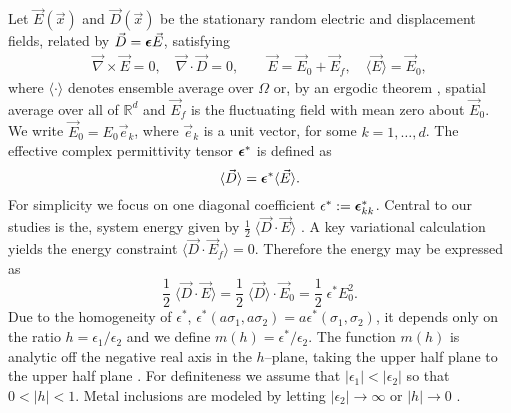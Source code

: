 \documentclass[english,12pt]{ttuthes}
\newcommand\beps{\mbox{\boldmath${\epsilon}$}}
\begin{document}
Let $\vec{E}(\vec{x})$ and $\vec{D}(\vec{x})$ be the stationary random
electric and displacement fields, related by $\vec{D}= \beps
\vec{E}$, satisfying \cite{Golden:CMP-473} 
%
\begin{align}\label{eq:Maxwells_Equations_ED}  
	\vec{\nabla}\times\vec{E}=0, \quad
	\vec{\nabla}\cdot\vec{D}=0,\quad \quad	
	\vec{E}=\vec{E}_0+\vec{E}_f, \quad
	\langle\vec{E}\rangle=\vec{E}_0,
\end{align}
%
where $\langle \cdot \rangle$ denotes ensemble average over $\Omega$ or, by an ergodic
theorem \cite{Golden:CMP-473}, spatial average
over all of ${\mathbb{R}}^d$ and $\vec{E}_f$ is the fluctuating field
with mean zero about $\vec{E}_0$. We write $\vec{E}_0=E_0\vec{e}_k$,
where $\vec{e}_k$ is a unit vector, for some $k = 1, \ldots, d$. The
effective complex permittivity tensor $\beps^*$ is defined as 
%
\begin{equation}                                    \label{eq:eff_eps_def}
    \langle \vec{D} \rangle=  \beps ^* \langle \vec{E} \rangle.
\end{equation}
%
For simplicity we focus on one diagonal
coefficient $\epsilon^*:=\beps^*_{kk}$. Central to our studies is the,
system energy given by $\frac{1}{2}\;\langle\vec{D}\cdot\vec{E}\rangle$
\cite{Jackson-1999}. A key variational calculation \cite{Golden:CMP-473}
yields the energy constraint $\langle\vec{D}\cdot\vec{E}_f\rangle=0$. Therefore
the energy may be expressed as  
%
\begin{equation}                                    \label{eq:Reduced_Energy}
    \frac{1}{2}\;\langle\vec{D}\cdot\vec{E}\rangle
      =\frac{1}{2}\;\langle\vec{D}\rangle\cdot\vec{E}_0
        =  \frac{1}{2}\;\epsilon^* E_0^2.
\end{equation}
%
Due to the homogeneity of $\epsilon^*$, $\epsilon^*(a\sigma_1,a\sigma_2)=a\epsilon^*(\sigma_1,\sigma_2)$, it
depends only on the ratio $h = \epsilon_1/\epsilon_2$ and we define $m(h)
=\epsilon^*/\epsilon_2$. The function $m(h)$ is analytic off the negative real axis
in the $h$--plane, taking the upper half plane to the upper half plane
\cite{Golden:CMP-473}. For definiteness we assume that $|\epsilon_1|<|\epsilon_2|$
so that $0<|h|<1$. Metal inclusions are modeled by letting $|\epsilon_2|\to\infty$
or $|h|\to0$ \cite{Wen:SoftMatter-200,Jackson-1999}.    
\end{document}
